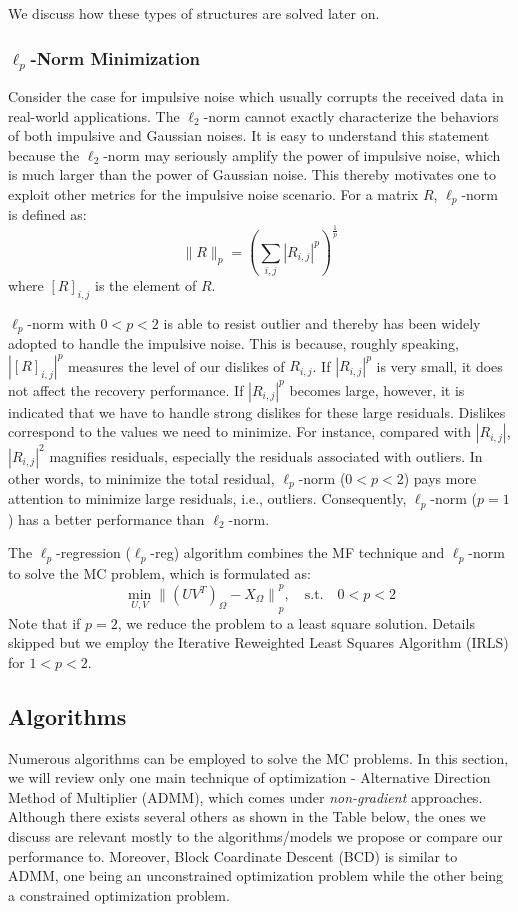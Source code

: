 We discuss how these types of structures are solved later on. 

\subsubsection{$\ell_p$-Norm Minimization}
Consider the case for impulsive noise which usually corrupts the received data in real-world applications. The $\ell_2$-norm cannot exactly characterize the behaviors of both impulsive and Gaussian noises. It is easy to understand this statement because the $\ell_2$-norm may seriously amplify the power of impulsive noise, which is much larger than the power of Gaussian noise. This thereby motivates one to exploit other metrics for the impulsive noise scenario. For a matrix $R$, $\ell_p$-norm is defined as:
\[
\|R\|_{p} = \left( \sum_{i,j} |R_{i,j}|^p \right)^{\frac{1}{p}}
\]
where $[R]_{i,j}$ is the element of $R$.

$\ell_p$-norm with $0 < p < 2$ is able to resist outlier and thereby has been widely adopted to handle the impulsive noise. This is because, roughly speaking, $|[R]_{i,j}|^p$ measures the level of our dislikes of $R_{i,j}$. If $|R_{i,j}|^p$ is very small, it does not affect the recovery performance. If $|R_{i,j}|^p$ becomes large, however, it is indicated that we have to handle strong dislikes for these large residuals. Dislikes correspond to the values we need to minimize. For instance, compared with $|R_{i,j}|$, $|R_{i,j}|^2$ magnifies residuals, especially the residuals associated with outliers. In other words, to minimize the total residual, $\ell_p$-norm ($0 < p < 2$) pays more attention to minimize large residuals, i.e., outliers. Consequently, $\ell_p$-norm ($p = 1$) has a better performance than $\ell_2$-norm.

The $\ell_p$-regression ($\ell_p$-reg) algorithm \cite{lp_reg} combines the MF technique and $\ell_p$-norm to solve the MC problem, which is formulated as:
\[
\min_{U,V} {\|(UV^T)_{\Omega} - X_{\Omega}\|}_{p}^{p}, \quad \text{s.t.} \quad 0 < p < 2
\]
Note that if $p = 2$, we reduce the problem to a least square solution. Details skipped but we employ the Iterative Reweighted Least Squares Algorithm (IRLS) \cite{irls} for $1 < p < 2$. 

\subsection{Algorithms}
Numerous algorithms can be employed to solve the MC problems. In this section, we will review only one main technique of optimization - Alternative Direction Method of Multiplier (ADMM), which comes under \textit{non-gradient} approaches. Although there exists several others as shown in the Table below, the ones we discuss are relevant mostly to the algorithms/models we propose or compare our performance to. Moreover, Block Coardinate Descent (BCD) is similar to ADMM, one being an unconstrained optimization problem while the other being a constrained optimization problem.

